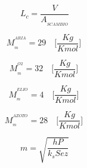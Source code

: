 \documentclass[10pt,portrait,a4paper]{article}
\begin{document}
\begin{multicols}{2}
\[ L_{c} = \frac {V}{A_{_{SCAMBIO}}} \]



\[ M_{_{m}}^{^{ARIA}} = 29 \quad \Big [ \frac {Kg}{Kmol} \Big ] \ \]

\[ M_{_{m}}^{^{O2}} = 32 \quad \Big [ \frac {Kg}{Kmol} \Big ] \ \]

\[ M_{_{m}}^{^{ELIO}} = 4 \quad \Big [ \frac {Kg}{Kmol} \Big ] \ \]

\[ M_{_{m}}^{^{AZOTO}} = 28 \quad \Big [ \frac {Kg}{Kmol} \Big ] \ \]





\[ m = \sqrt{
	\frac{hP}{k_s Sez}
}
\]


\end{multicols}
\end{document}
